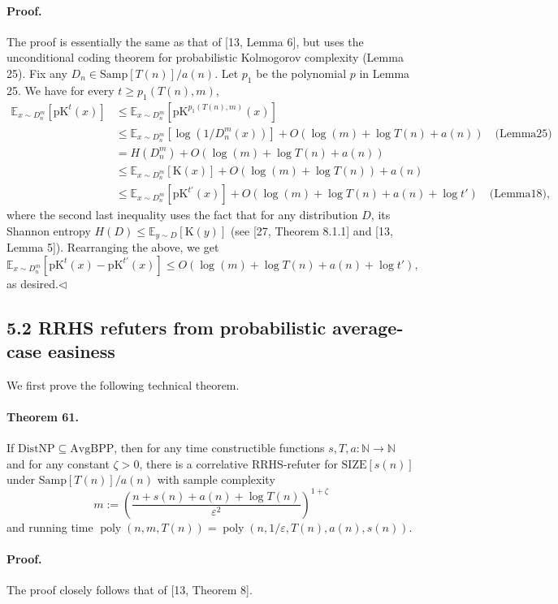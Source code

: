 \documentclass[10pt,a4paper]{article}
\begin{document}
\paragraph{Proof.} The proof is essentially the same as that of [13, Lemma 6], but uses the unconditional coding theorem for probabilistic Kolmogorov complexity (Lemma 25).
Fix any $D_n\in\mathrm{Samp}[T(n)]/a(n)$. Let $p_1$ be the polynomial $p$ in Lemma 25. We have for every $t\geq p_1(T(n),m)$,
\begin{align*}
\mathbb E_{x\sim D_n^m}[\mathrm{pK}^t(x)]&\leq\mathbb E_{x\sim D_n^m}[\mathrm{pK}^{p_1(T(n),m)}(x)]\\
&\leq\mathbb E_{x\sim D_n^m}[\log(1/D_n^m(x))]+O(\log(m)+\log T(n)+a(n))\quad\text{(Lemma25)}\\
&=H(D_n^m)+O(\log(m)+\log T(n)+a(n))\\
&\leq\mathbb E_{x\sim D_n^m}[\mathrm K(x)]+O(\log(m)+\log T(n))+a(n)\\
&\leq\mathbb E_{x\sim D_n^m}[\mathrm{pK}^{t'}(x)]+O(\log(m)+\log T(n)+a(n)+\log t')\quad\text{(Lemma18)},
\end{align*}
where the second last inequality uses the fact that for any distribution $D$, its Shannon entropy $H(D)\leq\mathbb E_{y\sim D}[\mathrm K(y)]$ (see [27, Theorem 8.1.1] and [13, Lemma 5]). Rearranging the above, we get
\[\mathbb E_{x\sim D_n^m}[\mathrm{pK}^t(x)-\mathrm{pK}^{t'}(x)]\leq O(\log(m)+\log T(n)+a(n)+\log t'),\]
as desired.\hfill$\triangleleft$
\subsection*{5.2 RRHS refuters from probabilistic average-case easiness}
We first prove the following technical theorem.
\paragraph{Theorem 61.} If $\mathrm{DistNP}\subseteq\mathrm{AvgBPP}$, then for any time constructible functions $s,T,a:\mathbb N\to\mathbb N$ and for any constant $\zeta>0$, there is a correlative RRHS-refuter for $\mathrm{SIZE}[s(n)]$ under $\mathrm{Samp}[T(n)]/a(n)$ with sample complexity
\[m:=\left(\frac{n+s(n)+a(n)+\log T(n)}{\varepsilon^2}\right)^{1+\zeta}\]
and running time $\operatorname{poly}(n,m,T(n))=\operatorname{poly}(n,1/\varepsilon,T(n),a(n),s(n))$.
\paragraph{Proof.} The proof closely follows that of [13, Theorem 8].
\end{document}
